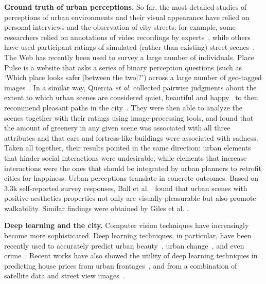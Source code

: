 
\vspace{4pt}\noindent
\textbf{Ground truth of urban perceptions.} So far, the most detailed studies of perceptions of urban environments and their visual appearance have relied on personal interviews and the observation of city streets: for example, some researchers relied on annotations of video recordings by experts~\cite{sampson04seeing}, while others have used participant ratings of simulated (rather than existing) street scenes~\cite{lindal2012}. The Web has recently been used to survey a large number of individuals. Place Pulse is a website that asks a series of binary perception questions (such as `Which place looks safer [between the two]?') across a large number of geo-tagged images~\cite{salesses2013collaborative}. In a similar way, Quercia \emph{et al.} collected pairwise judgments about the extent to which urban scenes are considered quiet, beautiful and happy~\cite{quercia2014aesthetic} to then recommend pleasant paths in the city~\cite{quercia2014shortest}. They were then able to analyze the scenes together with their ratings using image-processing tools, and found that the amount of greenery in any given scene was associated with all three attributes and that cars and fortress-like buildings were associated with sadness. Taken all together, their results pointed in the same direction: urban elements that hinder social interactions were undesirable, while elements that increase interactions were the ones that should be integrated by urban planners to retrofit cities for happiness. Urban perceptions translate in concrete outcomes. Based on 3.3k self-reported survey responses,  Ball et al.~\cite{ball2001perceived} found that urban scenes with positive aesthetics properties  not only are visually  pleasurable but also promote walkability. Similar findings were obtained by Giles et al. \cite{giles2005increasing}.

\vspace{4pt}\noindent
\textbf{Deep learning and the city.} Computer vision techniques have increasingly become more sophisticated. Deep learning techniques, in particular, have been recently used to accurately predict urban beauty~\cite{dubey2016deep,seresinhe2017using}, urban change~\cite{naik2017computer}, and even crime~\cite{DeNadai16,arietta2014city}.  Recent works have also showed the utility of deep learning techniques in predicting house prices from urban frontages~\cite{frontage}, and from a combination of satellite data and street view images~\cite{law2018take}.


